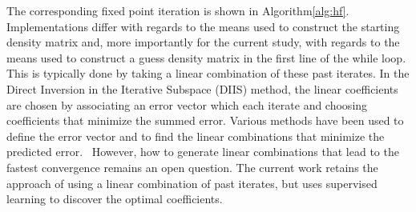 \documentclass[twoside,11pt]{article}
\begin{document}
The corresponding fixed point iteration is shown in Algorithm\ref{alg:hf}. Implementations differ with regards to the means used to construct the starting density matrix and, more importantly for the current study, with regards to the means used to construct a guess density matrix in the first line of the while loop. This is typically done by taking a linear combination of these past iterates. In the Direct Inversion in the Iterative Subspace (DIIS) method\citep{Pulay1980}, the linear coefficients are chosen by associating an error vector which each iterate and choosing coefficients that minimize the summed error. Various methods have been used to define the error vector and to find the linear combinations that minimize the predicted error.~\citep{ADIIS,compScuseria,Alejandro2012} However, how to generate linear combinations that lead to the fastest convergence remains an open question\citep{Konstantin2002, Thorsten2011}. The current work retains the approach of using a linear combination of past iterates, but uses supervised learning to discover the optimal coefficients. 



\end{document}
